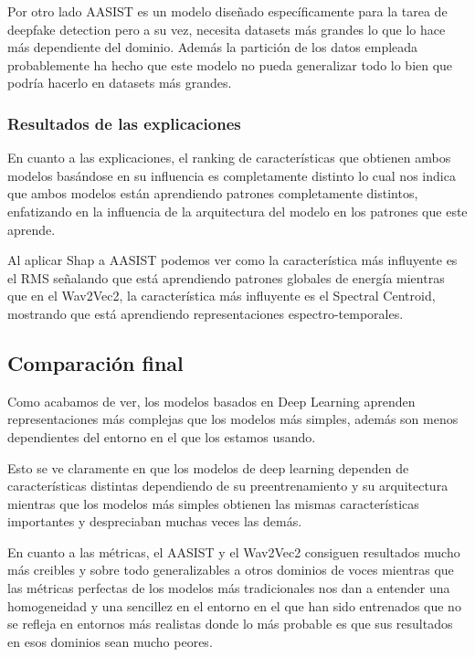 Por otro lado AASIST es un modelo diseñado específicamente para la tarea de deepfake detection pero a su vez, necesita datasets más grandes lo que lo hace más dependiente del dominio. Además la partición de los datos empleada probablemente ha hecho que este modelo no pueda generalizar todo lo bien que podría hacerlo en datasets más grandes.

\subsubsection*{Resultados de las explicaciones}

En cuanto a las explicaciones, el ranking de características que obtienen ambos modelos basándose en su influencia es completamente distinto lo cual nos indica que ambos modelos están aprendiendo patrones completamente distintos, enfatizando en la influencia de la arquitectura del modelo en los patrones que este aprende.

Al aplicar Shap a AASIST podemos ver como la característica más influyente es el RMS señalando que está aprendiendo patrones globales de energía mientras que en el Wav2Vec2, la característica más influyente es el Spectral Centroid, mostrando que está aprendiendo representaciones espectro-temporales.

\subsection*{Comparación final}

Como acabamos de ver, los modelos basados en Deep Learning aprenden representaciones más complejas que los modelos más simples, además son menos dependientes del entorno en el que los estamos usando.

Esto se ve claramente en que los modelos de deep learning dependen de características distintas dependiendo de su preentrenamiento y su arquitectura mientras que los modelos más simples obtienen las mismas características importantes y despreciaban muchas veces las demás.

En cuanto a las métricas, el AASIST y el Wav2Vec2 consiguen resultados mucho más creibles y sobre todo generalizables a otros dominios de voces mientras que las métricas perfectas de los modelos más tradicionales nos dan a entender una homogeneidad y una sencillez en el entorno en el que han sido entrenados que no se refleja en entornos más realistas donde lo más probable es que sus resultados en esos dominios sean mucho peores.